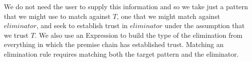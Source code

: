 We do not need the user to supply this information and so we take just a pattern
that we might use to match against $T$, one that we might match against $eliminator$,
and seek to establish trust in $eliminator$ under the assumption that we trust $T$.
We also use an Expression to build the type of the elimination from everything in
which the premise chain has established trust. Matching an elimination rule requires
matching both the target pattern and the eliminator.
\begin{code}%
\>[0]\AgdaSpace{}%
\AgdaSpace{}%
\AgdaSymbol{:}\AgdaSpace{}%
\AgdaSpace{}%
\<%
\\
\>[0][@{}l@{\AgdaIndent{0}}]%
\>[2]\<%
\\
\>[2][@{}l@{\AgdaIndent{0}}]%
\>[4]%
\>[16]\AgdaSymbol{:}%
\>[19]\AgdaSpace{}%
\<%
\\
%
\>[4]%
\>[16]\AgdaSymbol{:}%
\>[19]\AgdaSpace{}%
\<%
\\
%
\>[4]%
\>[16]\AgdaSymbol{:}%
\>[19]\AgdaFunction{Σ[}\AgdaSpace{}%
\AgdaSpace{}%
\AgdaSpace{}%
\AgdaSpace{}%
\AgdaSpace{}%
\AgdaFunction{]}\AgdaSpace{}%
\AgdaSpace{}%
\AgdaSpace{}%
\AgdaSpace{}%
\<%
\\
%
\>[4]%
\>[16]\AgdaSymbol{:}%
\>[19]\AgdaSpace{}%
\AgdaSymbol{(}\AgdaSpace{}%
\AgdaSymbol{)}\AgdaSpace{}%
\AgdaSpace{}%
\<%
\\
\>[0]\AgdaSpace{}%
\<%
\end{code}

